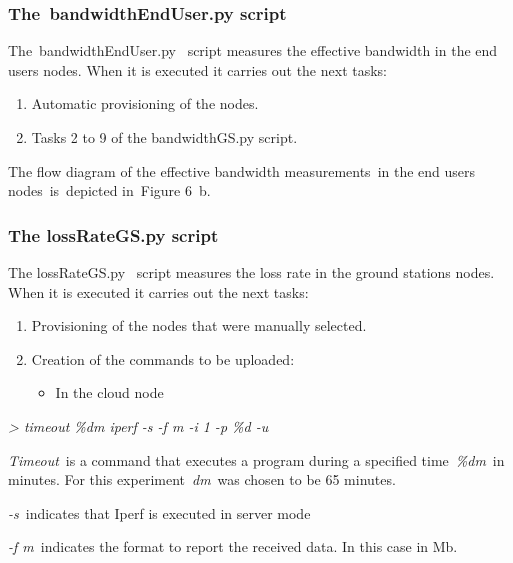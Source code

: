 \documentclass[a4paper]{article}
\newcounter{saveenum}
\newcommand\liststyleLFOix{%
\renewcommand\theenumi{\arabic{enumi}}
\renewcommand\theenumii{\roman{enumii}}
\renewcommand\theenumiii{\arabic{enumiii}}
\renewcommand\labelenumi{\theenumi.}
\renewcommand\labelitemi{o}
\renewcommand\labelenumii{\theenumii.}
\renewcommand\labelenumiii{\theenumiii.}
}
\newcommand\liststyleLFOx{%
\renewcommand\theenumi{\arabic{enumi}}
\renewcommand\theenumii{\roman{enumii}}
\renewcommand\theenumiii{\arabic{enumiii}}
\renewcommand\labelenumi{\theenumi.}
\renewcommand\labelitemi{o}
\renewcommand\labelenumii{\theenumii.}
\renewcommand\labelenumiii{\theenumiii.}
}
\begin{document}
\bigskip

\subsubsection[The\ bandwidthEndUser.py script]{The\ bandwidthEndUser.py
script}
The\ bandwidthEndUser.py \ script measures the effective bandwidth in
the end users nodes. When it is executed it carries out the next tasks:

\liststyleLFOix
\setcounter{saveenum}{\value{enumi}}
\begin{enumerate}
\setcounter{enumi}{\value{saveenum}}
\item Automatic provisioning of the nodes.
\item Tasks 2 to 9 of the bandwidthGS.py script.
\end{enumerate}
The flow diagram of the effective bandwidth measurements\ in the end
users nodes\ is\ depicted in\ Figure 6\ b.

\subsubsection{The lossRateGS.py script}

\bigskip

The lossRateGS.py \ script measures the loss rate in the ground stations
nodes. When it is executed it carries out the next tasks:

\liststyleLFOx
\setcounter{saveenum}{\value{enumi}}
\begin{enumerate}
\setcounter{enumi}{\value{saveenum}}
\item Provisioning of the nodes that were manually selected.
\item Creation of the commands to be uploaded:

\begin{itemize}
\item In the cloud node
\end{itemize}
\end{enumerate}
{\itshape
{\textgreater} timeout \%dm iperf -s -f m -i 1 -p \%d -u}

\textit{Timeout}\ is a command that executes a program during a
specified time\ \textit{\%dm}\ in minutes. For this
experiment\ \textit{dm}\ was chosen to be 65 minutes.

\textit{{}-s}\ indicates that Iperf is executed in server mode

\textit{{}-f m}\ indicates the format to report the received data. In
this case in Mb. \ 
\end{document}
